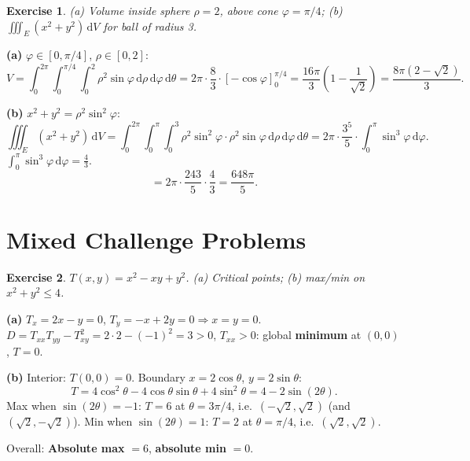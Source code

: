 \documentclass[12pt,a4paper]{article}
\theoremstyle{exstyle}
\newtheorem{exercise}{Exercise}[section]
\newcommand{\dif}[1]{\,\mathrm{d}#1}
\begin{document}
\begin{exercise}
(a) Volume inside sphere $\rho=2$, above cone $\varphi=\pi/4$;
(b) $\iiint_E(x^2+y^2)\dif{V}$ for ball of radius 3.
\end{exercise}
\begin{solbox}
\textbf{(a)} $\varphi\in[0,\pi/4]$, $\rho\in[0,2]$:
\[
  V=\int_0^{2\pi}\!\int_0^{\pi/4}\!\int_0^2\rho^2\sin\varphi\dif\rho\dif\varphi\dif\theta
  =2\pi\cdot\frac{8}{3}\cdot[-\cos\varphi]_0^{\pi/4}
  =\frac{16\pi}{3}\!\left(1-\frac{1}{\sqrt{2}}\right)=\frac{8\pi(2-\sqrt{2})}{3}.
\]

\textbf{(b)} $x^2+y^2=\rho^2\sin^2\!\varphi$:
\[
  \iiint_E(x^2+y^2)\dif{V}=\int_0^{2\pi}\!\int_0^\pi\!\int_0^3\rho^2\sin^2\!\varphi\cdot\rho^2\sin\varphi\dif\rho\dif\varphi\dif\theta
  =2\pi\cdot\frac{3^5}{5}\cdot\int_0^\pi\sin^3\!\varphi\dif\varphi.
\]
$\int_0^\pi\sin^3\!\varphi\dif\varphi=\tfrac{4}{3}$.
\[
  =2\pi\cdot\frac{243}{5}\cdot\frac{4}{3}=\frac{648\pi}{5}.
\]
\end{solbox}

\section{Mixed Challenge Problems}

\begin{exercise}
$T(x,y)=x^2-xy+y^2$. (a) Critical points; (b) max/min on $x^2+y^2\le4$.
\end{exercise}
\begin{solbox}
\textbf{(a)} $T_x=2x-y=0$, $T_y=-x+2y=0\Rightarrow x=y=0$.
$D=T_{xx}T_{yy}-T_{xy}^2=2\cdot2-(-1)^2=3>0$, $T_{xx}>0$: global \textbf{minimum} at $(0,0)$, $T=0$.

\textbf{(b)} Interior: $T(0,0)=0$.
Boundary $x=2\cos\theta$, $y=2\sin\theta$:
\[
  T=4\cos^2\!\theta-4\cos\theta\sin\theta+4\sin^2\!\theta=4-2\sin(2\theta).
\]
Max when $\sin(2\theta)=-1$: $T=6$ at $\theta=3\pi/4$, i.e.\ $(-\sqrt{2},\sqrt{2})$ (and $(\sqrt{2},-\sqrt{2})$).
Min when $\sin(2\theta)=1$: $T=2$ at $\theta=\pi/4$, i.e.\ $(\sqrt{2},\sqrt{2})$.

Overall: \textbf{Absolute max} $=6$, \textbf{absolute min} $=0$.
\end{solbox}
\end{document}
